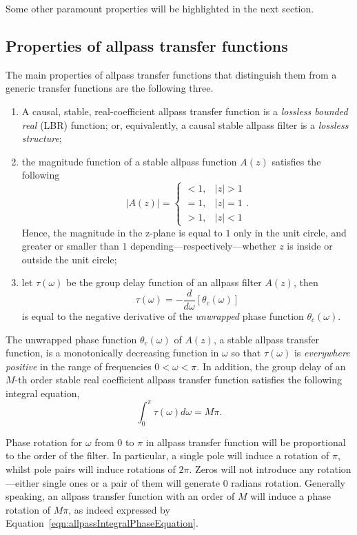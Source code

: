 \documentclass[\documentfontsize, twocolumn]{\classname}
\begin{document}
Some other paramount properties will be highlighted in the next section.

\subsection{Properties of allpass transfer functions}
The main properties of allpass transfer functions that distinguish them from a generic transfer functions are the following three.
\begin{enumerate}
    \item A causal, stable, real-coefficient allpass transfer function is a \emph{lossless bounded real} (LBR) function; or, equivalently, a causal stable allpass filter is a \emph{lossless structure};
    \item the magnitude function of a stable allpass function $A(z)$ satisfies the following
        \[
            |A(z)| = 
            \left\{
                \begin{array}{ll}
                    < 1, & |z| > 1\\
                    = 1, & |z| = 1\\
                    > 1, & |z| < 1
                \end{array}
            \right..
        \]
        Hence, the magnitude in the z-plane is equal to $1$ only in the unit circle, and greater or smaller than $1$ depending---respectively---whether $z$ is inside or outside the unit circle;
    \item let $\tau(\omega)$ be the group delay function of an allpass filter $A(z)$, then
        \[
            \tau(\omega) = -\frac{d}{d\omega}[\theta_c(\omega)]
        \]
        is equal to the negative derivative of the \emph{unwrapped} phase function $\theta_c(\omega)$.
\end{enumerate}
The unwrapped phase function $\theta_c(\omega)$ of $A(z)$, a stable allpass transfer function, is a monotonically decreasing function in $\omega$ so that $\tau(\omega)$ is \emph{everywhere positive} in the range of frequencies $0 < \omega < \pi$. In addition, the group delay of an $M$-th order stable real coefficient allpass transfer function satisfies the following integral equation,
\begin{equation}\label{eqn:allpassIntegralPhaseEquation}
    \int_0^\pi \tau(\omega)d\omega = M\pi.
\end{equation}

Phase rotation for $\omega$ from $0$ to $\pi$ in allpass transfer function will be proportional to the order of the filter. In particular, a single pole will induce a rotation of $\pi$, whilst pole pairs will induce rotations of $2\pi$. Zeros will not introduce any rotation---either single ones or a pair of them will generate $0$ radians rotation. Generally speaking, an allpass transfer function with an order of $M$ will induce a phase rotation of $M\pi$, as indeed expressed by Equation~\ref{eqn:allpassIntegralPhaseEquation}.
\end{document}
